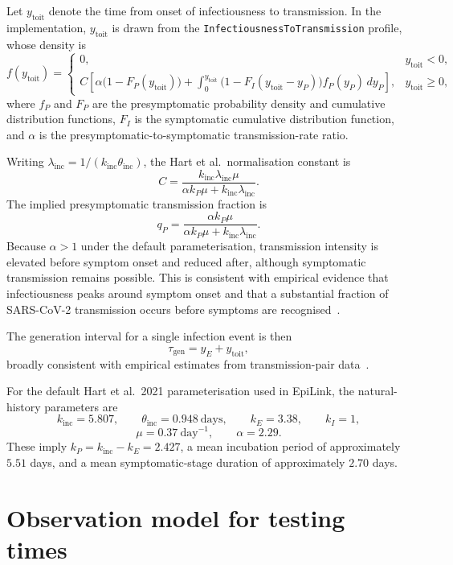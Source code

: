 \documentclass[11pt,a4paper]{article}
\begin{document}
Let $y_{\mathrm{toit}}$ denote the time from onset of infectiousness to transmission. In the implementation, $y_{\mathrm{toit}}$ is drawn from the \texttt{InfectiousnessToTransmission} profile, whose density is~\cite{Hart2021}
\[
f(y_{\mathrm{toit}}) =
\begin{cases}
0, & y_{\mathrm{toit}} < 0, \\[6pt]
C\!\left[\alpha\bigl(1 - F_P(y_{\mathrm{toit}})\bigr)
+ \int_0^{y_{\mathrm{toit}}}
  \bigl(1 - F_I(y_{\mathrm{toit}} - y_P)\bigr) f_P(y_P)\,dy_P\right],
& y_{\mathrm{toit}} \ge 0,
\end{cases}
\]
where $f_P$ and $F_P$ are the presymptomatic probability density and cumulative distribution functions, $F_I$ is the symptomatic cumulative distribution function, and $\alpha$ is the presymptomatic-to-symptomatic transmission-rate ratio.

Writing $\lambda_{\mathrm{inc}} = 1/(k_{\mathrm{inc}}\theta_{\mathrm{inc}})$, the Hart et al.\ normalisation constant is
\[
C = \frac{k_{\mathrm{inc}}\lambda_{\mathrm{inc}}\mu}
         {\alpha k_P \mu + k_{\mathrm{inc}}\lambda_{\mathrm{inc}}}.
\]
The implied presymptomatic transmission fraction is
\[
q_P = \frac{\alpha k_P \mu}{\alpha k_P \mu + k_{\mathrm{inc}}\lambda_{\mathrm{inc}}}.
\]
Because $\alpha > 1$ under the default parameterisation, transmission intensity is elevated before symptom onset and reduced after, although symptomatic transmission remains possible. This is consistent with empirical evidence that infectiousness peaks around symptom onset and that a substantial fraction of SARS-CoV-2 transmission occurs before symptoms are recognised~\cite{He2020, Ferretti2020}.

The generation interval for a single infection event is then
\[
\tau_{\mathrm{gen}} = y_E + y_{\mathrm{toit}},
\]
broadly consistent with empirical estimates from transmission-pair data~\cite{Ganyani2020, Hart2022}.

For the default Hart et al.\ 2021 parameterisation used in EpiLink, the natural-history parameters are
\[
k_{\mathrm{inc}} = 5.807, \qquad
\theta_{\mathrm{inc}} = 0.948\ \mathrm{days}, \qquad
k_E = 3.38, \qquad
k_I = 1,
\]
\[
\mu = 0.37\ \mathrm{day}^{-1}, \qquad
\alpha = 2.29.
\]
These imply $k_P = k_{\mathrm{inc}} - k_E = 2.427$, a mean incubation period of approximately $5.51$ days, and a mean symptomatic-stage duration of approximately $2.70$ days.

\section{Observation model for testing times}
\label{sec:S1_obsmodel}
\end{document}

